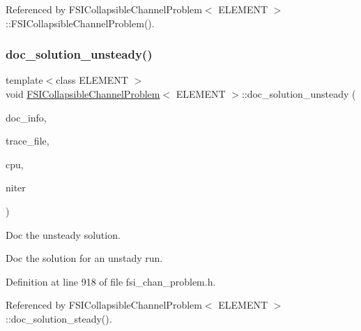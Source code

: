 Referenced by F\+S\+I\+Collapsible\+Channel\+Problem$<$ E\+L\+E\+M\+E\+N\+T $>$\+::\+F\+S\+I\+Collapsible\+Channel\+Problem().

\mbox{\label{classFSICollapsibleChannelProblem_aa9c8f2c34cea9b43e1496cc63b1f496c}} 
\subsubsection{\texorpdfstring{doc\+\_\+solution\+\_\+unsteady()}{doc\_solution\_unsteady()}}
{\footnotesize\ttfamily template$<$class E\+L\+E\+M\+E\+NT $>$ \\
void \hyperlink{classFSICollapsibleChannelProblem}{F\+S\+I\+Collapsible\+Channel\+Problem}$<$ E\+L\+E\+M\+E\+NT $>$\+::doc\+\_\+solution\+\_\+unsteady (\begin{DoxyParamCaption}\item[{Doc\+Info \&}]{doc\+\_\+info,  }\item[{ofstream \&}]{trace\+\_\+file,  }\item[{const double \&}]{cpu,  }\item[{const unsigned \&}]{niter }\end{DoxyParamCaption})\hspace{0.3cm}{\ttfamily [virtual]}}



Doc the unsteady solution. 

Doc the solution for an unstady run. 

Definition at line 918 of file fsi\+\_\+chan\+\_\+problem.\+h.



Referenced by F\+S\+I\+Collapsible\+Channel\+Problem$<$ E\+L\+E\+M\+E\+N\+T $>$\+::doc\+\_\+solution\+\_\+steady().

\mbox{\label{classFSICollapsibleChannelProblem_a2a947a11c11090b39d2bc4439fb96e36}} 
